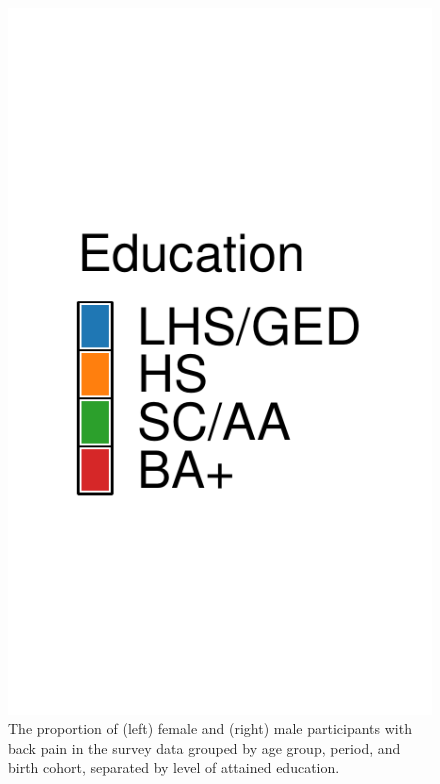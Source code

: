 \begin{figure}[!ht]
\begin{minipage}{.2\textwidth}
      \includegraphics[width = \textwidth]{Figures/number_prop_legend_m.pdf}
  \end{minipage}
  \caption{The proportion of (left) female and (right) male participants with back pain in the survey data grouped by age group, period, and birth cohort, separated by level of attained education.}
  \label{figure:data_prop}
\end{figure}

